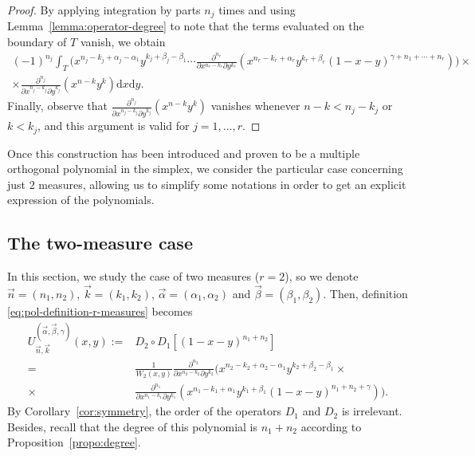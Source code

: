 \documentclass[11pt,reqno]{amsart}
\newcommand{\dr}{\mathrm{d}}
\theoremstyle{definition}
\begin{document}
\begin{proof}
    By applying integration by parts $n_j$ times and using Lemma~\ref{lemma:operator-degree} to note that the terms evaluated on the boundary of $T$ vanish, we obtain
    \begin{multline*}
        (-1)^{n_j}\int_T \Big(x^{n_j-k_j+\alpha_j-\alpha_{1}}y^{k_{j}+\beta_j-\beta_{1}} \cdots \frac{\partial^{n_r}}{\partial x^{n_r-k_r}\partial y^{k_r}}(x^{n_r-k_r+\alpha_r}y^{k_r+\beta_r}(1-x-y)^{\gamma+n_1+\cdots+n_r})\Big) \times \\ \times \frac{\partial^{n_j}}{\partial x^{n_j-k_j}\partial y^{k_j}}(x^{n-k}y^k)\dr x\dr y.
    \end{multline*}
    Finally, observe that $\frac{\partial^{n_j}}{\partial x^{n_j-k_j}\partial y^{k_j}}(x^{n-k}y^k)$ vanishes whenever $n-k<n_j-k_j$ or $k<k_j$, and this argument is valid for $j=1,\dots,r$.
\end{proof}


Once this construction has been introduced and proven to be a multiple orthogonal polynomial in the simplex, we consider the particular case concerning just $2$ measures, allowing us to simplify some notations in order to get an explicit expression of the polynomials. 

\subsection{The two-measure case}
\label{sec:2-measures}

In this section,  we study the case of two measures ($r=2$), so we denote $\vec n = (n_1,n_2)$, $\vec k=(k_1,k_2)$, $\vec\alpha=(\alpha_1,\alpha_2)$ and $\vec\beta=(\beta_1,\beta_2)$. Then, definition \eqref{eq:pol-definition-r-measures} becomes
\begin{equation}
\label{eq:pol-definition}
    \begin{split}
    U_{\vec n, \vec k}^{(\vec \alpha, \vec \beta, \gamma)}(x,y) :=& D_2\circ D_1[(1-x-y)^{n_1+n_2}]  \\ =& 
        \frac{1}{W_2(x,y)} \frac{\partial^{n_2}}{\partial x^{n_2-k_2}\partial y^{k_2}}\Big(x^{n_2-k_2+\alpha_2-\alpha_1}y^{k_2+\beta_2-\beta_1} \times\\ \times  & \frac{\partial^{n_1}}{\partial x^{n_1-k_1}\partial y^{k_1}}\left(x^{n_1-k_1+\alpha_1}y^{k_1+\beta_1}(1-x-y)^{n_1+n_2+\gamma}\right)\Big). 
    \end{split}
\end{equation}
By Corollary~\ref{cor:symmetry}, the order of the operators $D_1$ and $D_2$ is irrelevant. Besides, recall that the degree of this polynomial is $n_1+n_2$ according to Proposition~\ref{propo:degree}.
\end{document}
